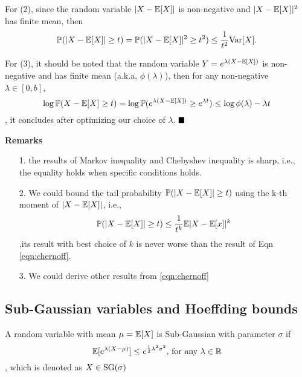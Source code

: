 For (2), since the random variable $|X-{\mathbb{E}}[X]|$ is non-negative and $|X-{\mathbb{E}}[X]|^2$ has finite mean, then 
\begin{equation*}
    {\mathbb{P}}(|X-{\mathbb{E}}[X]|\ge t)={\mathbb{P}}(|X-{\mathbb{E}}[X]|^2\ge t^2)\le \frac{1}{t^2} {\mathrm{Var}}[X].
\end{equation*}

For (3), it should be noted that the random variable $Y=e^{\lambda(X-{\mathbb{E}}[X])}$ is non-negative and has finite mean (a.k.a, $\phi(\lambda)$), then for any non-negative $\lambda\in [0, b]$,
\begin{equation*}
    \log {\mathbb{P}}(X-{\mathbb{E}}[X]\ge t) = \log {\mathbb{P}}(e^{\lambda(X-{\mathbb{E}}[X])}\ge e^{\lambda t}) \le \log\phi(\lambda)-\lambda t
\end{equation*}, it concludes after optimizing our choice of $\lambda$. $\proofend$ 

\noindent \textbf{Remarks} 
\begin{itemize}
\item[1.] the results of Markov inequality and Chebyshev inequality is sharp, i.e., the equality holds when specific conditions holds.  \\
\item[2.] We could bound the tail probability ${\mathbb{P}}(|X-{\mathbb{E}}[X]|\ge t)$ using the k-th moment of $|X-{\mathbb{E}}[X]|$, i.e., 
\begin{equation*}
{\mathbb{P}}(|X-{\mathbb{E}}[X]|\ge t) \le \frac{1}{t^k} {\mathbb{E}} |X-{\mathbb{E}}[x]|^k
\end{equation*},its result with best choice of $k$ is never worse than the result of Eqn \ref{eqn:chernoff}. 
\item[3.] We could derive other results from \ref{eqn:chernoff} 
\end{itemize}

\subsection{Sub-Gaussian variables and Hoeffding bounds}

\begin{definition}
A random variable with mean $\mu={\mathbb{E}}[X]$ is Sub-Gaussian with parameter $\sigma$ if 
\begin{equation}
    {\mathbb{E}}[e^{\lambda(X-\mu)}]\le e^{\frac{1}{2}\lambda^2\sigma^2}\text{, for any }\lambda\in {\mathbb{R}}
\end{equation}, which is denoted as $X\in {\mathrm{SG}}{(\sigma)}$
\end{definition}

